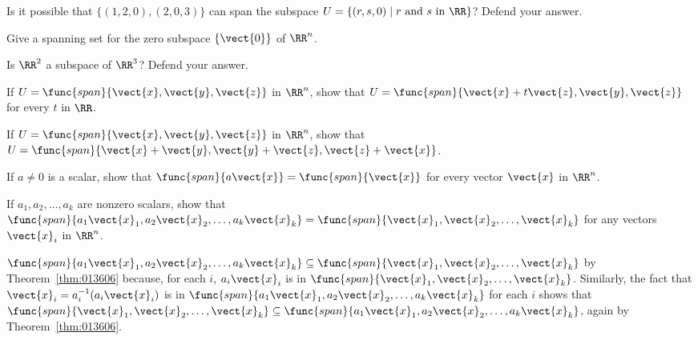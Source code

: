 \begin{multicols}{2}
\begin{ex}
Is it possible that $\{(1, 2, 0), (2, 0, 3)\}$ can span the subspace $U = \{(r, s, 0) \mid r \mbox{ and } s \mbox{ in } \RR\}$? Defend your answer.
\end{ex}

\begin{ex}
Give a spanning set for the zero subspace $\{\vect{0}\}$ of $\RR^n$.
\end{ex}

\begin{ex}
Is $\RR^2$ a subspace of $\RR^3$? Defend your answer.
\end{ex}

\begin{ex}
If $U = \func{span}\{\vect{x}, \vect{y}, \vect{z}\}$ in $\RR^n$, show that $U = \func{span}\{\vect{x} + t\vect{z}, \vect{y}, \vect{z}\}$ for every $t$ in $\RR$.
\end{ex}

\begin{ex}
If $U = \func{span}\{\vect{x}, \vect{y}, \vect{z}\}$ in $\RR^n$, show that $U = \func{span}\{\vect{x} + \vect{y}, \vect{y} + \vect{z}, \vect{z} + \vect{x}\}$.
\end{ex}

\begin{ex}
If $a \neq 0$ is a scalar, show that $\func{span}\{a\vect{x}\} = \func{span}\{\vect{x}\}$ for every vector $\vect{x}$ in $\RR^n$.
\end{ex}

\begin{ex}
If $a_{1}, a_{2}, \dots, a_{k}$ are nonzero scalars, show that $\func{span}\{a_{1}\vect{x}_{1}, a_{2}\vect{x}_{2}, \dots, a_{k}\vect{x}_{k}\} = \func{span}\{\vect{x}_{1}, \vect{x}_{2}, \dots, \vect{x}_{k}\}$ for any vectors $\vect{x}_{i}$ in $\RR^n$.

\begin{sol}
$\func{span}\{a_{1}\vect{x}_{1}, a_{2}\vect{x}_{2}, \dots, a_{k}\vect{x}_{k}\} \subseteq \func{span}\{\vect{x}_{1}, \vect{x}_{2}, \dots, \vect{x}_{k}\}$ by Theorem~\ref{thm:013606} because, for each $i$, $a_{i}\vect{x}_{i}$ is in $\func{span}\{\vect{x}_{1}, \vect{x}_{2}, \dots, \vect{x}_{k}\}$. Similarly, the fact that $\vect{x}_{i} = a_{i}^{-1}(a_{i}\vect{x}_{i})$ is in $\func{span}\{a_{1}\vect{x}_{1}, a_{2}\vect{x}_{2}, \dots, a_{k}\vect{x}_{k}\}$ for each $i$ shows that $\func{span}\{\vect{x}_{1}, \vect{x}_{2}, \dots, \vect{x}_{k}\} \subseteq \func{span}\{a_{1}\vect{x}_{1}, a_{2}\vect{x}_{2}, \dots, a_{k}\vect{x}_{k}\}$, again by Theorem~\ref{thm:013606}.
\end{sol}
\end{ex}


\end{multicols}
